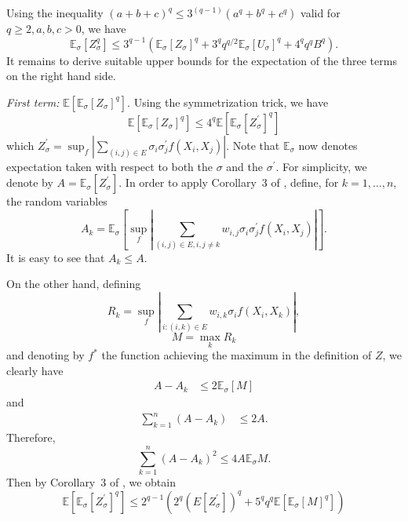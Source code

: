 \documentclass[letterpaper]{article} %
\newcommand{\E}{\mathbb{E}}
\newcommand{\rademacher}{\sigma}
\newcommand{\pair}[1]{(#1)}
\begin{document}
Using the inequality $(a+b+c)^q\le 3^{(q-1)}(a^q+b^q+c^q)$ valid for $q\ge 2,a,b,c>0$, we have
\[\E_\rademacher[Z_\rademacher^q]\le 3^{q-1}(\E_\rademacher[Z_\rademacher]^q+3^qq^{q/2}\E_\rademacher[U_\rademacher]^q+4^qq^qB^q).\]
It remains to derive suitable upper bounds for the expectation of the three terms on the right hand side.

\textit{First term:} $\E[\E_\rademacher[Z_\rademacher]^q]$. Using the symmetrization trick, we have
\[\E[\E_\rademacher[Z_\rademacher]^q]\le 4^q\E[\E_\rademacher[Z_\rademacher^\prime]^q]\]
which $Z_\rademacher^\prime = \sup_f|\sum_{\pair{i,j}\in E}\rademacher_i\rademacher_j^\prime f(X_i,X_j)|$. Note that $\E_\rademacher$ now denotes expectation taken with respect to both the $\rademacher$ and the $\rademacher^\prime$. For simplicity, we denote by $A=\E_{\rademacher}[Z_\rademacher^\prime]$. In order to apply Corollary~3 of \cite{Boucheron2005}, define, for $k=1,\dots,n$, the random variables
\[A_k = \E_{\rademacher}[\sup_f |\sum_{\pair{i,j}\in E,i,j\neq k}w_{i,j}\rademacher_i\rademacher_j^\prime f(X_i,X_j)|].\]
It is easy to see that $A_k\le A$.

On the other hand, defining
\[R_k=\sup_f|\sum_{i:\pair{i,k}\in E}w_{i,k}\rademacher_if(X_i,X_k)|,\]
\[M=\max_kR_k\]
and denoting by $f^*$ the function achieving the maximum in the definition of $Z$, we clearly have
\begin{align*}
    A-A_k
    &\le 2\E_\rademacher[M]
\end{align*}
and
\begin{align*}
    \sum_{k=1}^n(A-A_k)
    &\le 2A.
\end{align*}
Therefore,
\[\sum_{k=1}^n(A-A_k)^2\le 4A\E_\rademacher M.\]
Then by Corollary~3 of \cite{Boucheron2005}, we obtain
\begin{equation}
    \label{eq:inequality_rademacher_chaos_1}
    \E[\E_\rademacher[Z_\rademacher^\prime]^q]\le 2^{q-1}(2^q(E[Z_\rademacher^\prime])^q+5^qq^q\E[\E_\rademacher[M]^q])
\end{equation}
\end{document}
